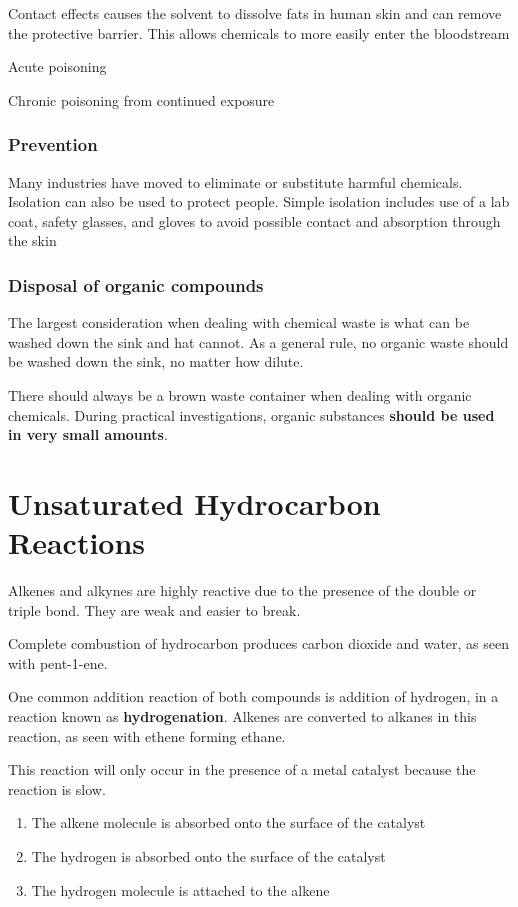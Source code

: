 				Contact effects causes the solvent to dissolve fats in human skin and can remove the protective barrier. This allows chemicals to more easily enter the bloodstream

				Acute poisoning

				Chronic poisoning from continued exposure

			\subsubsection{Prevention}
			
				Many industries have moved to eliminate or substitute harmful chemicals. Isolation can also be used to protect people. Simple isolation includes use of a lab coat, safety glasses, and gloves to avoid possible contact and absorption through the skin

			\subsubsection{Disposal of organic compounds}
				
				The largest consideration when dealing with chemical waste is what can be washed down the sink and hat cannot. As a general rule, no organic waste should be washed down the sink, no matter how dilute. 

				There should always be a brown waste container when dealing with organic chemicals. During practical investigations, organic substances \textbf{should be used in very small amounts}.

\section{Unsaturated Hydrocarbon Reactions}

	Alkenes and alkynes are highly reactive due to the presence of the double or triple bond. They are weak and easier to break.

	Complete combustion of hydrocarbon produces carbon dioxide and water, as seen with pent-1-ene.

	One common addition reaction of both compounds is addition of hydrogen, in a reaction known as \textbf{hydrogenation}. Alkenes are converted to alkanes in this reaction, as seen with ethene forming ethane.

	This reaction will only occur in the presence of a metal catalyst because the reaction is slow.

	\begin{enumerate}
		\item The alkene molecule is absorbed onto the surface of the catalyst
		\item The hydrogen is absorbed onto the surface of the catalyst
		\item The hydrogen molecule is attached to the alkene
	\end{enumerate}

